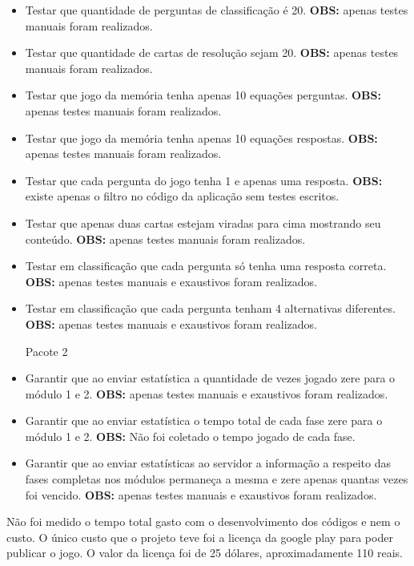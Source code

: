 \begin{itemize}
\item Testar que quantidade de perguntas de classificação é 20. \textbf{OBS:} apenas testes manuais foram realizados.  

\item Testar que quantidade de cartas de resolução sejam 20. \textbf{OBS:} apenas testes manuais foram realizados.  

\item Testar que jogo da memória tenha apenas 10 equações perguntas. \textbf{OBS:} apenas testes manuais foram realizados.  

\item Testar que jogo da memória tenha apenas 10 equações respostas. \textbf{OBS:} apenas testes manuais foram realizados.  

\item Testar que cada pergunta do jogo tenha 1 e apenas uma resposta. \textbf{OBS:} existe apenas o filtro no código da aplicação sem testes escritos.  

\item Testar que apenas duas cartas estejam viradas para cima mostrando seu conteúdo. \textbf{OBS:} apenas testes manuais foram realizados.  

\item Testar em classificação que cada pergunta só tenha uma resposta correta. \textbf{OBS:} apenas testes manuais e exaustivos foram realizados.  

\item Testar em classificação que cada pergunta tenham 4 alternativas diferentes. \textbf{OBS:} apenas testes manuais e exaustivos foram realizados.  


	Pacote 2
\item Garantir que ao enviar estatística a quantidade de vezes jogado zere para o módulo 1 e 2. \textbf{OBS:} apenas testes manuais e exaustivos foram realizados.  

\item Garantir que ao enviar estatística o tempo  total de cada fase zere para o módulo 1 e 2. \textbf{OBS:} Não foi coletado o tempo jogado de cada fase.  

\item Garantir que ao enviar estatísticas ao servidor a informação a respeito das fases completas nos módulos permaneça a mesma e zere apenas quantas vezes foi vencido. \textbf{OBS:} apenas testes manuais e exaustivos foram realizados.  
\end{itemize}

Não foi medido o tempo total gasto com o desenvolvimento dos códigos e nem o custo. O único custo que o projeto teve foi a licença da google play para poder publicar o jogo. O valor da licença foi de 25 dólares, aproximadamente 110 reais. 